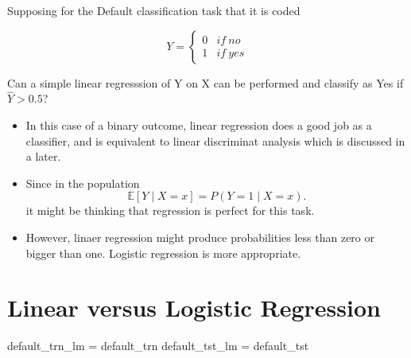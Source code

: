 \documentclass[]{report}
\newenvironment{Shaded}{\begin{snugshade}}{\end{snugshade}}
\newcommand{\KeywordTok}[1]{\textcolor[rgb]{0.13,0.29,0.53}{\textbf{#1}}}
\newcommand{\DecValTok}[1]{\textcolor[rgb]{0.00,0.00,0.81}{#1}}
\newcommand{\StringTok}[1]{\textcolor[rgb]{0.31,0.60,0.02}{#1}}
\newcommand{\OperatorTok}[1]{\textcolor[rgb]{0.81,0.36,0.00}{\textbf{#1}}}
\newcommand{\NormalTok}[1]{#1}
\providecommand{\tightlist}{%
  \setlength{\itemsep}{0pt}\setlength{\parskip}{0pt}}
\begin{document}
Supposing for the Default classification task that it is coded

\[{Y} = 
\begin{cases} 
      0 & if \ no \\
      1 & if \ yes
\end{cases}\]

Can a simple linear regresssion of Y on X can be performed and classify
as Yes if \(\hat{Y} > 0.5\)?

\begin{itemize}
\tightlist
\item
  In this case of a binary outcome, linear regression does a good job as
  a classifier, and is equivalent to linear discriminat analysis which
  is discussed in a later.
\item
  Since in the population
  \[\mathbb{E}[Y \mid X = x] = P(Y = 1 \mid X = x).\] it might be
  thinking that regression is perfect for this task.
\item
  However, linaer regression might produce probabilities less than zero
  or bigger than one. Logistic regression is more appropriate.
\end{itemize}

\section{Linear versus Logistic
Regression}\label{linear-versus-logistic-regression}

\begin{Shaded}
\begin{Highlighting}[]
\NormalTok{default_trn_lm =}\StringTok{ }\NormalTok{default_trn}
\NormalTok{default_tst_lm =}\StringTok{ }\NormalTok{default_tst}
\end{Highlighting}
\end{Shaded}

\begin{Shaded}
\end{Shaded}
\end{document}
